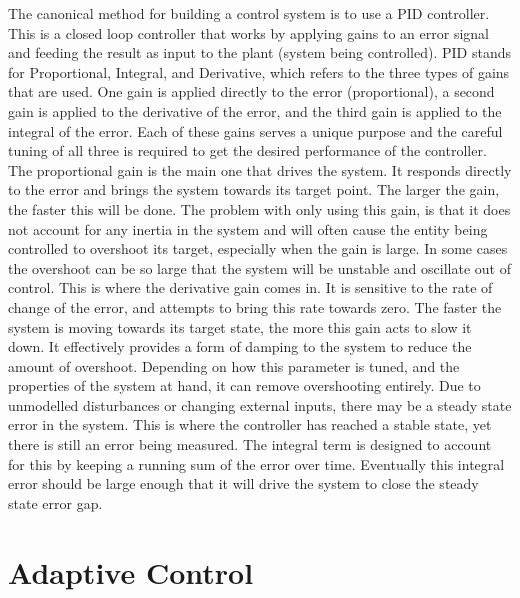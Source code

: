 \documentclass[letterpaper,12pt,titlepage,oneside,final]{book}
\begin{document}
The canonical method for building a control system is to use a PID controller. 
This is a closed loop controller that works by applying gains to an error signal and feeding the result as input to the plant (system being controlled). 
PID stands for Proportional, Integral, and Derivative, which refers to the three types of gains that are used. 
One gain is applied directly to the error (proportional), a second gain is applied to the derivative of the error, and the third gain is applied to the integral of the error. 
Each of these gains serves a unique purpose and the careful tuning of all three is required to get the desired performance of the controller. 
The proportional gain is the main one that drives the system. 
It responds directly to the error and brings the system towards its target point. 
The larger the gain, the faster this will be done. 
The problem with only using this gain, is that it does not account for any inertia in the system and will often cause the entity being controlled to overshoot its target, especially when the gain is large. 
In some cases the overshoot can be so large that the system will be unstable and oscillate out of control. This is where the derivative gain comes in. 
It is sensitive to the rate of change of the error, and attempts to bring this rate towards zero. 
The faster the system is moving towards its target state, the more this gain acts to slow it down. 
It effectively provides a form of damping to the system to reduce the amount of overshoot.
Depending on how this parameter is tuned, and the properties of the system at hand, it can remove overshooting entirely. 
Due to unmodelled disturbances or changing external inputs, there may be a steady state error in the system. 
This is where the controller has reached a stable state, yet there is still an error being measured. 
The integral term is designed to account for this by keeping a running sum of the error over time. 
Eventually this integral error should be large enough that it will drive the system to close the steady state error gap.

\section{Adaptive Control}

\end{document}
